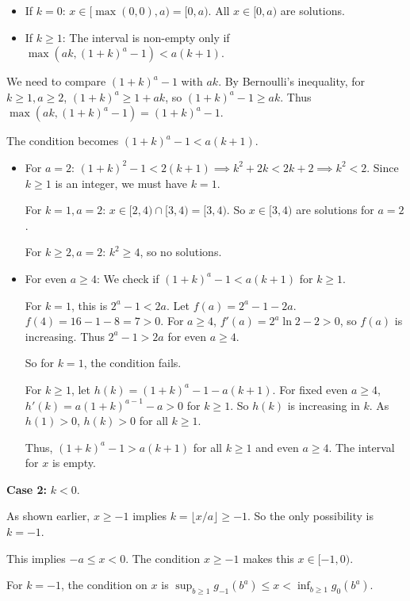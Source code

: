 \documentclass[12pt,a4paper]{article}
\theoremstyle{definition}
\begin{document}
    \begin{itemize}
        \item If $k=0$: $x \in [\max(0, 0), a) = [0,a)$. All $x \in [0,a)$ are solutions.

        \item If $k \ge 1$: The interval is non-empty only if $\max(ak, (1+k)^a-1) < a(k+1)$.
    \end{itemize}

    We need to compare $(1+k)^a-1$ with $ak$. By Bernoulli's inequality, for $k \ge 1, a \ge 2$, $(1+k)^a \ge 1+ak$, so $(1+k)^a-1 \ge ak$. Thus $\max(ak, (1+k)^a-1) = (1+k)^a-1$.

    The condition becomes $(1+k)^a-1 < a(k+1)$.

    \begin{itemize}
        \item For $a=2$: $(1+k)^2-1 < 2(k+1) \implies k^2+2k < 2k+2 \implies k^2<2$. Since $k \ge 1$ is an integer, we must have $k=1$.

        For $k=1, a=2$: $x \in [2,4) \cap [3,4) = [3,4)$. So $x \in [3,4)$ are solutions for $a=2$.

        For $k \ge 2, a=2$: $k^2 \ge 4$, so no solutions.

        \item For even $a \ge 4$: We check if $(1+k)^a-1 < a(k+1)$ for $k \ge 1$.

        For $k=1$, this is $2^a-1 < 2a$. Let $f(a)=2^a-1-2a$. $f(4)=16-1-8=7>0$. For $a \ge 4$, $f'(a) = 2^a\ln 2 - 2 > 0$, so $f(a)$ is increasing. Thus $2^a-1 > 2a$ for even $a \ge 4$.

        So for $k=1$, the condition fails.

        For $k \ge 1$, let $h(k) = (1+k)^a-1-a(k+1)$. For fixed even $a \ge 4$, $h'(k)=a(1+k)^{a-1}-a > 0$ for $k \ge 1$. So $h(k)$ is increasing in $k$. As $h(1)>0$, $h(k)>0$ for all $k \ge 1$.

        Thus, $(1+k)^a-1 > a(k+1)$ for all $k \ge 1$ and even $a \ge 4$. The interval for $x$ is empty.
    \end{itemize}

    \textbf{Case 2:} $k < 0$.

    As shown earlier, $x \ge -1$ implies $k=\lfloor x/a \rfloor \ge -1$. So the only possibility is $k=-1$.

    This implies $-a \le x < 0$. The condition $x \ge -1$ makes this $x \in [-1,0)$.

    For $k=-1$, the condition on $x$ is $\sup_{b\ge 1} g_{-1}(b^a) \le x < \inf_{b\ge 1} g_{0}(b^a)$.
\end{document}
